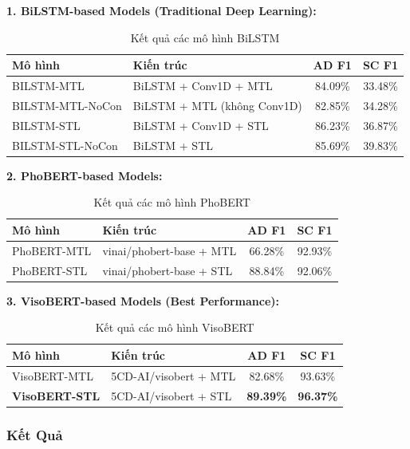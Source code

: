 \textbf{1. BiLSTM-based Models (Traditional Deep Learning):}
\begin{table}[H]
\centering
\begin{tabular}{|l|l|c|c|}
\hline
\textbf{Mô hình} & \textbf{Kiến trúc} & \textbf{AD F1} & \textbf{SC F1} \\
\hline
BILSTM-MTL & BiLSTM + Conv1D + MTL & 84.09\% & 33.48\% \\
\hline
BILSTM-MTL-NoCon & BiLSTM + MTL (không Conv1D) & 82.85\% & 34.28\% \\
\hline
BILSTM-STL & BiLSTM + Conv1D + STL & 86.23\% & 36.87\% \\
\hline
BILSTM-STL-NoCon & BiLSTM + STL & 85.69\% & 39.83\% \\
\hline
\end{tabular}
\caption{Kết quả các mô hình BiLSTM}
\label{tab:bilstm-results}
\end{table}

\textbf{2. PhoBERT-based Models:}
\begin{table}[H]
\centering
\begin{tabular}{|l|l|c|c|}
\hline
\textbf{Mô hình} & \textbf{Kiến trúc} & \textbf{AD F1} & \textbf{SC F1} \\
\hline
PhoBERT-MTL & vinai/phobert-base + MTL & 66.28\% & 92.93\% \\
\hline
PhoBERT-STL & vinai/phobert-base + STL & 88.84\% & 92.06\% \\
\hline
\end{tabular}
\caption{Kết quả các mô hình PhoBERT}
\label{tab:phobert-results}
\end{table}

\textbf{3. VisoBERT-based Models (Best Performance):}
\begin{table}[H]
\centering
\begin{tabular}{|l|l|c|c|}
\hline
\textbf{Mô hình} & \textbf{Kiến trúc} & \textbf{AD F1} & \textbf{SC F1} \\
\hline
VisoBERT-MTL & 5CD-AI/visobert + MTL & 82.68\% & 93.63\% \\
\hline
\textbf{VisoBERT-STL} & 5CD-AI/visobert + STL & \textbf{89.39\%} & \textbf{96.37\%} \\
\hline
\end{tabular}
\caption{Kết quả các mô hình VisoBERT}
\label{tab:visobert-results}
\end{table}

\subsubsection{Kết Quả}

